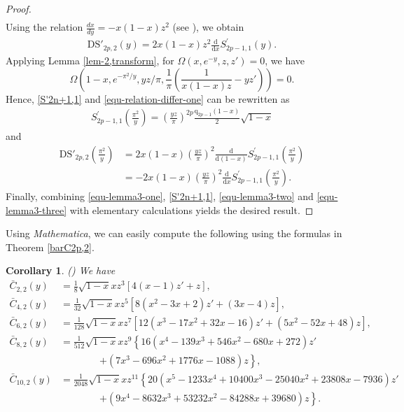 \documentclass[11pt]{article}
\theoremstyle{plain}
\newtheorem{cor}[thm]{Corollary}
\theoremstyle{definition}
\begin{document}
\begin{proof}
\begin{align*}
\end{align*}
Using the relation $\frac{dx}{dy}=-x(1-x)z^2$ (see \cite[P. 120, Entry. 9(i)]{B1991}), we obtain
\begin{align}\label{equ-relation-differ-one}
\text{DS}'_{2p,2}\left( y \right)=2x\left( 1-x \right) z^2\frac{\mathrm{d}}{\mathrm{d}x}S_{2p-1,1}^{\prime}\left( y \right).
\end{align}
Applying Lemma \ref{lem-2,transform}, for $\Omega \left( x,e^{-y},z,z' \right) =0$, we have
$$\Omega \left( 1-x,e^{-\pi ^2/y},yz/\pi ,\frac{1}{\pi}\left( \frac{1}{x\left( 1-x \right) z}-yz' \right) \right) =0.$$
Hence,  \eqref{S'2n+1,1} and \eqref{equ-relation-differ-one} can be rewritten as
\begin{align}\label{equ-lemma3-two}
S_{2p-1,1}^{\prime}\left( \frac{\pi ^2}{y} \right) =\left( \frac{yz}{\pi} \right) ^{2p}\frac{\mathrm{q}_{2p-1}\left( 1-x \right)}{2}\sqrt{1-x}
\end{align}
and
\begin{align}\label{equ-lemma3-three}
\text{DS}'_{2p,2}\left( \frac{\pi ^2}{y} \right)&=2x\left( 1-x \right) \left( \frac{yz}{\pi} \right) ^2\frac{\mathrm{d}}{\mathrm{d}\left( 1-x \right)}S_{2p-1,1}^{\prime}\left( \frac{\pi ^2}{y} \right)\nonumber\\
&=-2x\left( 1-x \right) \left( \frac{yz}{\pi} \right) ^2\frac{\mathrm{d}}{\mathrm{d}x}S_{2p-1,1}^{\prime}\left( \frac{\pi ^2}{y} \right).
\end{align}
Finally, combining \eqref{equ-lemma3-one}, \eqref{S'2n+1,1}, \eqref{equ-lemma3-two} and \eqref{equ-lemma3-three} with elementary calculations yields the desired result.
\end{proof}

Using \emph{Mathematica}, we can easily compute the following using the formulas in Theorem \ref{barC2p,2}.
\begin{cor}\emph{(\cite[Cor. 1]{XuZhao-2024})} We have
\begin{align*}
\bar{C}_{2,2}(y)&=\frac{1}{8}\sqrt{1 - x}xz^{3}[4(x - 1)z'+z],\\
\bar{C}_{4,2}(y)&=\frac{1}{32}\sqrt{1 - x}xz^{5}[8(x^{2}-3x + 2)z'+(3x - 4)z],\\
\bar{C}_{6,2}(y)&=\frac{1}{128}\sqrt{1 - x}xz^{7}[12(x^{3}-17x^{2}+32x - 16)z'+(5x^{2}-52x + 48)z],\\
\bar{C}_{8,2}(y)&=\frac{1}{512}\sqrt{1 - x}xz^{9}\left\{16(x^{4}-139x^{3}+546x^{2}-680x + 272)z'\right.\\
&\quad\quad\quad\quad\left.+ (7x^{3}-696x^{2}+1776x - 1088)z\right\},\\
\bar{C}_{10,2}(y)&=\frac{1}{2048}\sqrt{1 - x}xz^{11}\left\{20(x^{5}-1233x^{4}+10400x^{3}-25040x^{2}+23808x - 7936)z'\right.\\
&\quad\quad\quad\quad\left.+ (9x^{4}-8632x^{3}+53232x^{2}-84288x + 39680)z\right\}.
\end{align*}
\end{cor}
\end{document}
